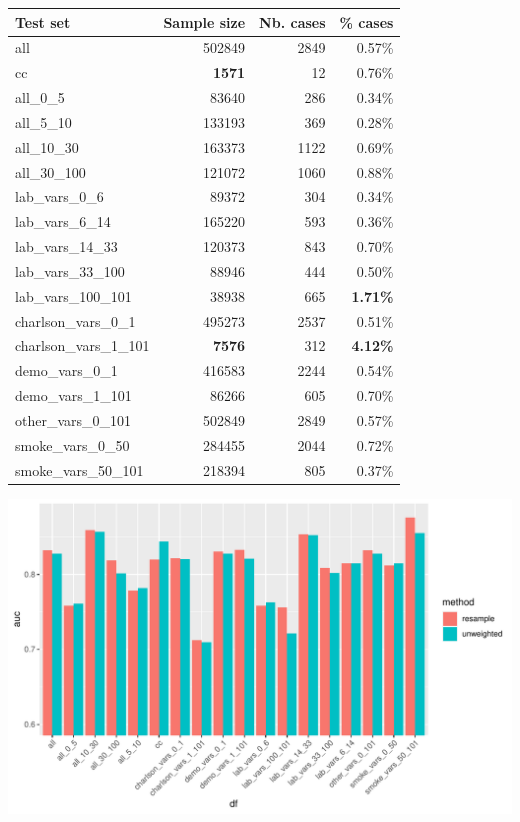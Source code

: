 \documentclass[12pt]{article}
\begin{document}
\begin{table}[ht]
\centering\small
\begin{tabular}{lrrr}
  \toprule
\textbf{Test set} & \textbf{Sample size} & \textbf{Nb. cases}& \textbf{\% cases} \\
  \midrule
all & 502849 & 2849 & 0.57\% \\ \addlinespace
cc & \textbf{1571} & 12 & 0.76\% \\
all\_0\_5 & 83640 & 286 & 0.34\% \\
all\_5\_10 & 133193 & 369 & 0.28\% \\
all\_10\_30 & 163373 & 1122 & 0.69\% \\
all\_30\_100 & 121072 & 1060 & 0.88\% \\\addlinespace
lab\_vars\_0\_6 & 89372 & 304 & 0.34\% \\
lab\_vars\_6\_14 & 165220 & 593 & 0.36\% \\
lab\_vars\_14\_33 & 120373 & 843 & 0.70\% \\
lab\_vars\_33\_100 & 88946 & 444 & 0.50\% \\
lab\_vars\_100\_101 & 38938 & 665 & \textbf{1.71\%} \\\addlinespace
charlson\_vars\_0\_1 & 495273 & 2537 & 0.51\% \\
charlson\_vars\_1\_101 & \textbf{7576} & 312 & \textbf{4.12\%} \\\addlinespace
demo\_vars\_0\_1 & 416583 & 2244 & 0.54\% \\
demo\_vars\_1\_101 & 86266 & 605 & 0.70\% \\\addlinespace
other\_vars\_0\_101 & 502849 & 2849 & 0.57\% \\\addlinespace
smoke\_vars\_0\_50 & 284455 & 2044 & 0.72\% \\
smoke\_vars\_50\_101 & 218394 & 805 & 0.37\% \\
   \bottomrule
\end{tabular}
\end{table}

\begin{center}
\includegraphics[width=\textwidth]{aucs.pdf}
\end{center}
\end{document}
